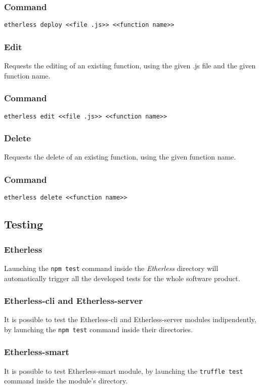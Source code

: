 	\subsubsection*{Command}
	\texttt{etherless deploy <<file .js>> <<function name>>}
	\subsubsection{Edit}
	Requests the editing of an existing function, using the given .js file and the given function name.
	\subsubsection*{Command}
	\texttt{etherless edit <<file .js>> <<function name>>}
	\subsubsection{Delete}
	Requests the delete of an existing function, using the given function name.
	\subsubsection*{Command}
	\texttt{etherless delete <<function name>>}
\subsection{Testing}
\subsubsection{Etherless}
Launching the \texttt{npm test} command inside the \textit{Etherless} directory will automatically trigger all the developed tests for the whole software product.
\subsubsection{Etherless-cli and Etherless-server}
It is possible to test the Etherless-cli and Etherless-server modules indipendently, by launching the \texttt{npm test} command inside their directories.
\subsubsection{Etherless-smart}
It is possible to test Etherless-smart module, by launching the \texttt{truffle test} command inside the module's directory.
